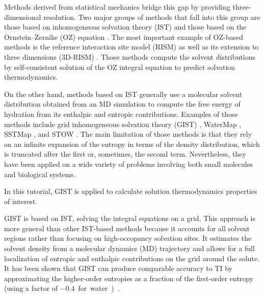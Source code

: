 \documentclass[9pt,tutorial]{livecoms}
\begin{document}
Methods derived from statistical mechanics bridge this gap by providing three-dimensional resolution.
Two major groups of methods that fall into this group are those based on inhomogeneous solvation theory (IST) \cite{Lazaridis1998} and those based on the Ornstein--Zernike (OZ) equation \cite{Hansen2013-simple-liquids}.
The most important example of OZ-based methods is the reference interaction site model (RISM) \cite{Chandler1972-rism} as well as its extension to three dimensions (3D-RISM) \cite{Kovalenko1998-3drism}.
Those methods compute the solvent distributions by self-consistent solution of the OZ integral equation to predict solvation thermodynamics.

On the other hand, methods based on IST generally use a molecular solvent distribution obtained from an MD simulation to compute the free energy of hydration from its enthalpic and entropic contributions.
Examples of those methods include grid inhomogeneous solvation theory (GIST) \cite{Nguyen2012,Ramsey2016}, WaterMap \cite{Young2007-watermap,Abel2008-watermap}, SSTMap \cite{Haider2018-sstmap}, and STOW \cite{Li2012-stow}.
The main limitation of those methods is that they rely on an infinite expansion of the entropy in terms of the density distribution, which is truncated after the first or, sometimes, the second \cite{Nguyen2016-gist-second-order,Waibl2022-gist-solvents} term.
Nevertheless, they have been applied on a wide variety of problems involving both small molecules and biological systems.

In this tutorial, GIST is applied to calculate solution thermodynamics properties of interest. 

GIST is based on IST, solving the integral equations on a grid. 
This approach is more general than other IST-based methods because it accounts for all solvent regions rather than focusing on high-occopancy solvation sites.
It estimates the solvent density from a molecular dynamics (MD) trajectory and allows for a full localization of entropic and enthalpic contributions on the grid around the solute.
It has been shown that GIST can produce comparable accuracy to TI by approximating the higher-order entropies as a fraction of the first-order entropy (using a factor of \SI{-0.4} for water) \cite{Chen2021,Waibl2022-gist-solvents}.
\end{document}
